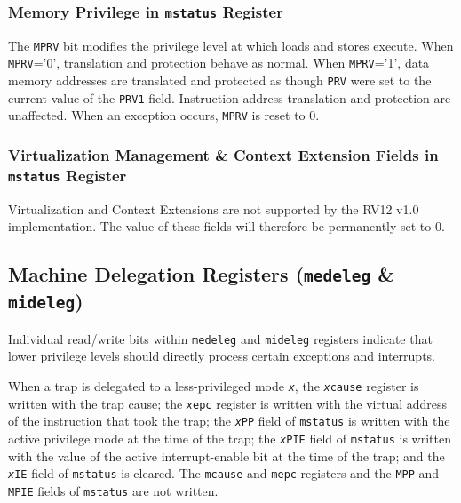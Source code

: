 \subsubsection{Memory Privilege in \texttt{mstatus} Register
}\label{memory-privilege-in-mstatus-register}

The \texttt{MPRV} bit modifies the privilege level at which loads and stores
execute. When \texttt{MPRV}='0', translation and protection behave as normal.
When \texttt{MPRV}='1', data memory addresses are translated and protected as
though \texttt{PRV} were set to the current value of the \texttt{PRV1} field. Instruction
address-translation and protection are unaffected. When an exception
occurs, \texttt{MPRV} is reset to 0.

\subsubsection{Virtualization Management \& Context Extension Fields in
\texttt{mstatus} Register
}\label{virtualization-management-context-extension-fields-in-mstatus-register}

Virtualization and Context Extensions are not supported by the RV12 v1.0
implementation. The value of these fields will therefore be permanently
set to 0.

\subsection{Machine Delegation Registers
(\texttt{medeleg} \& \texttt{mideleg})} \label{machine-exception-interrupt-delegation-registers-medeleg-mideleg}

Individual read/write bits within \texttt{medeleg} and \texttt{mideleg} registers indicate
that lower privilege levels should directly process certain exceptions
and interrupts.

When a trap is delegated to a less-privileged mode \texttt{\emph{x}}, the
\texttt{\emph{x}cause} register is written with the trap cause; the \texttt{\emph{x}epc}
register is written with the virtual address of the instruction that
took the trap; the \texttt{\emph{x}PP} field of \texttt{mstatus} is written with the
active privilege mode at the time of the trap; the \texttt{\emph{x}PIE} field of
\texttt{mstatus} is written with the value of the active interrupt-enable bit at
the time of the trap; and the \texttt{\emph{x}IE} field of \texttt{mstatus} is cleared.
The \texttt{mcause} and \texttt{mepc} registers and the \texttt{MPP} and \texttt{MPIE} fields of \texttt{mstatus} are not written.

